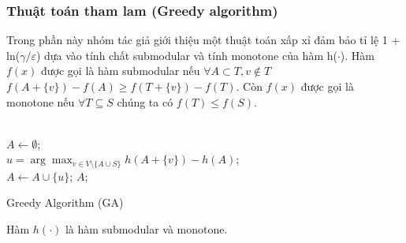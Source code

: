 \subsubsection{Thuật toán tham lam (Greedy algorithm)}
Trong phần này nhóm tác giả giới thiệu một thuật toán xấp xỉ đảm bảo tỉ lệ 1 + ln($\gamma / \varepsilon$) dựa vào tính chất submodular và tính monotone của hàm h($\cdot$). Hàm $f(x)$ được gọi là hàm submodular nếu $\forall A \subset T, v \notin T$ $ f(A+ \{v\})- f(A) \geq f(T+ \{v\})- f(T)$. Còn $f(x)$ được gọi là monotone nếu $\forall T \subseteq S$ chúng ta có $f(T) \leq f(S)$.
\\
\\
\begin{algorithm}[H]			
	$A \leftarrow \emptyset$;
	\\
	{ 	
		$u=\arg \max_{v \in V\setminus \{A \cup S\}} {h(A+ \{v\})- h(A)}$; 
		\\
		$A \leftarrow A \cup \{u\}$;
	}
	\Return $A$;
	\caption{Greedy Algorithm (GA)}
	\label{GA}
\end{algorithm}
\begin{theo}					
	Hàm $h(\cdot)$ là hàm submodular và monotone. 
	\label{sub}
\end{theo}	

